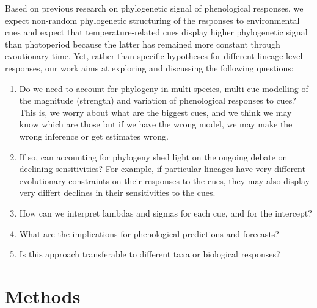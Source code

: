 \documentclass{article}\usepackage[]{graphicx}\usepackage[]{color}
\begin{document}
Based on previous research on phylogenetic signal of phenological responses, we expect non-random phylogenetic structuring of the responses to environmental cues \citep{davies2013phylogenetic,rafferty2017global,joly2019importance} and expect that temperature-related cues display higher phylogenetic signal than photoperiod because the latter has remained more constant through evoutionary time. Yet, rather than specific hypotheses for different lineage-level responses, our work aims at exploring and discussing the following questions:
\begin{enumerate}

\item Do we need to account for phylogeny in multi-species, multi-cue modelling of the magnitude (strength) and variation of phenological responses to cues? This is, we worry about what are the biggest cues, and we think we may know which are those but if we have the wrong model, we may make the wrong inference or get estimates wrong.
\item If so, can accounting for phylogeny shed light on the ongoing debate on declining sensitivities? For example, if particular lineages have very different evolutionary constraints on their responses to the cues, they may also display very differt declines in their sensitivities to the cues. %
\item How can we interpret lambdas and sigmas for each cue, and for the intercept?
\item What are the implications for phenological predictions and forecasts?
\item Is this approach transferable to different taxa or biological responses? 
\end{enumerate}


\clearpage



\section*{Methods}
\end{document}
